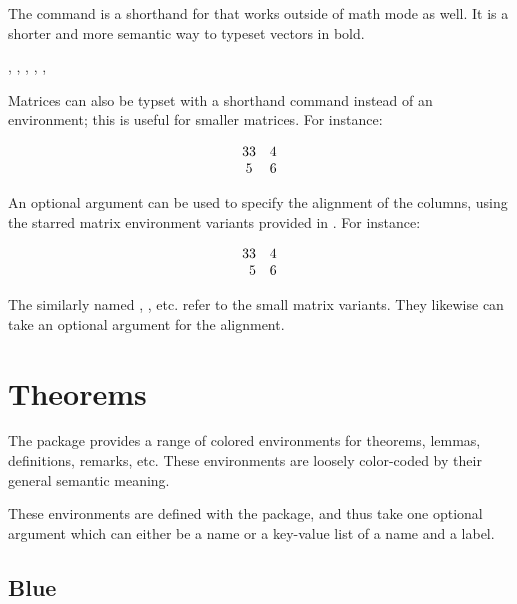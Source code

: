 \documentclass{l3doc}
\begin{document}
\begin{function}{\bvec}
  \begin{syntax}
     
  \end{syntax}

  The  command is a shorthand for  that works outside of math mode as well. It is a shorter and more semantic way to typeset vectors in bold.
\end{function}

\begin{function}{\mtx, \pmtx, \bmtx, \Bmtx, \vmtx, \Vmtx}
  \begin{syntax}
      
      
      
      
      
      
  \end{syntax}

  Matrices can also be typset with a shorthand command instead of an environment; this is useful for smaller matrices. For instance:

  \[ \mtx{33 & 4 \\ 5 & 6} \]

  An optional argument can be used to specify the alignment of the columns, using the starred matrix environment variants provided in . For instance:

  \[ \mtx[r]{33 & 4 \\ 5 & 6} \]

  The similarly named , , etc. refer to the small matrix variants. They likewise can take an optional argument for the alignment.
\end{function}

\section{Theorems}

The  package provides a range of colored environments for theorems, lemmas, definitions, remarks, etc. These environments are loosely color-coded by their general semantic meaning.

These environments are defined with the  package, and thus take one optional argument which can either be a name or a key-value list of a name and a label.

\subsection{Blue}
\end{document}
